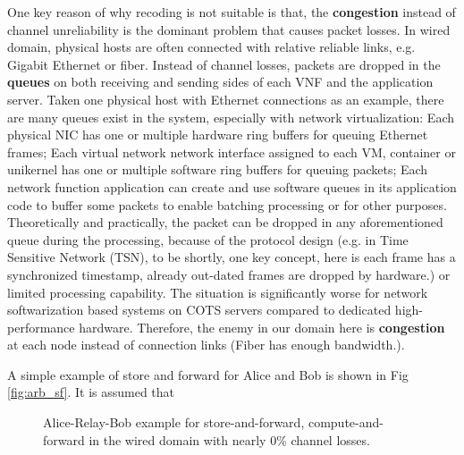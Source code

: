 \documentclass[12pt]{article}
\begin{document}
One key reason of why recoding is not suitable is that, the \textbf{congestion} instead of channel unreliability is the
dominant problem that causes packet losses. In wired domain, physical hosts are often connected with relative reliable
links, e.g. Gigabit Ethernet or fiber. Instead of channel losses, packets are dropped in the \textbf{queues} on both
receiving and sending sides of each VNF and the application server. Taken one physical host with Ethernet connections as
an example, there are many queues exist in the system, especially with network virtualization: Each physical NIC has one
or multiple hardware ring buffers for queuing Ethernet frames; Each virtual network network interface assigned to each
VM, container or unikernel has one or multiple software ring buffers for queuing packets; Each network function
application can create and use software queues in its application code to buffer some packets to enable batching
processing or for other purposes. Theoretically and practically, the packet can be dropped in any aforementioned queue
during the processing, because of the protocol design (e.g. in Time Sensitive Network (TSN), to be shortly, one key
concept, here is each frame has a synchronized timestamp, already out-dated frames are dropped by hardware.) or limited
processing capability. The situation is significantly worse for network softwarization based systems on COTS servers
compared to dedicated high-performance hardware. Therefore, the enemy in our domain here is \textbf{congestion} at each
node instead of connection links (Fiber has enough bandwidth.).

A simple example of store and forward for Alice and Bob is shown in Fig \ref{fig:arb_sf}. It is assumed that

\begin{figure}[h]
    \caption{Alice-Relay-Bob example for store-and-forward, compute-and-forward in the wired domain with nearly 0\%
    channel losses.}
    \label{fig:alice_relay_bob_example}
\end{figure}
\end{document}
